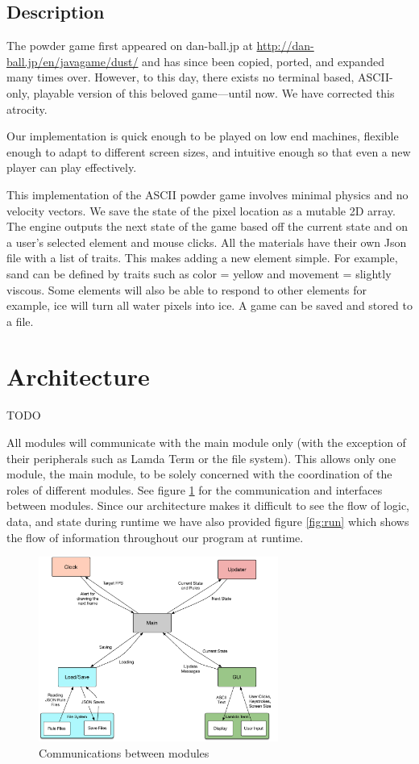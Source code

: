 \subsection{Description}
The powder game first appeared on dan-ball.jp at \url{http://dan-ball.jp/en/javagame/dust/} and has since been copied, ported, and expanded many times over. However, to this day, there exists no terminal based, ASCII-only, playable version of this beloved game---until now. We have corrected this atrocity.

Our implementation is quick enough to be played on low end machines, flexible enough to adapt to different screen sizes, and intuitive enough so that even a new player can play effectively. 

This implementation of the ASCII powder game involves minimal physics and no velocity vectors. We save the state of the pixel location as a mutable 2D array. The engine outputs the next state of the game based off the current state and on a user's selected element and mouse clicks. All the materials have their own Json file with a list of traits. This makes adding a new element simple. For example, sand can be defined by traits such as color = yellow and movement = slightly viscous. Some elements will also be able to respond to other elements for example, ice will turn all water pixels into ice. A game can be saved and stored to a file.

\section{Architecture}
TODO

All modules will communicate with the main module only (with the exception of their
peripherals such as Lamda Term or the file system). This allows only one module, the
main module, to be solely concerned with the coordination of the roles of different
modules. See figure \ref{fig:com} for the communication and interfaces between modules.
Since our architecture makes it difficult to see the flow of logic, data, and state during
runtime we have also provided figure \ref{fig:run} which shows the flow of information
throughout our program at runtime.

\begin{figure}[H]
  \caption{Communications between modules}
  \label{fig:com}
  \vspace{3em}
  \center\includegraphics[width=0.7\textwidth]{images/communications}
\end{figure}

